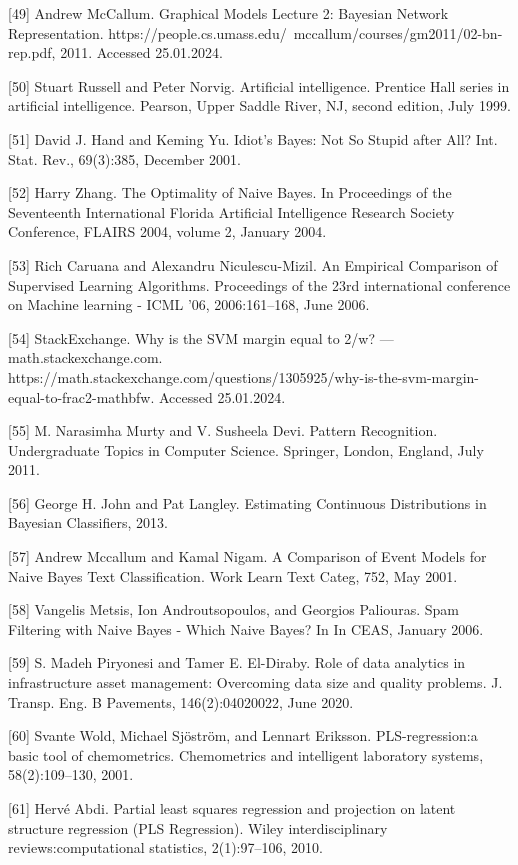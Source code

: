 \documentclass[preprint,12pt]{elsarticle}
\begin{document}
[49] Andrew McCallum. Graphical Models Lecture 2: Bayesian Network Representation. https://people.cs.umass.edu/~mccallum/courses/gm2011/02-bn-rep.pdf, 2011. Accessed 25.01.2024. 

[50] Stuart Russell and Peter Norvig. Artificial intelligence. Prentice Hall series in artificial intelligence. Pearson, Upper Saddle River, NJ, second edition, July 1999. 

[51] David J. Hand and Keming Yu. Idiot’s Bayes: Not So Stupid after All? Int. Stat. Rev., 69(3):385, December 2001. 

[52] Harry Zhang. The Optimality of Naive Bayes. In Proceedings of the Seventeenth International Florida Artificial Intelligence Research Society Conference, FLAIRS 2004, volume 2, January 2004. 

[53] Rich Caruana and Alexandru Niculescu-Mizil. An Empirical Comparison of Supervised Learning Algorithms. Proceedings of the 23rd international conference on Machine learning - ICML ’06, 2006:161–168, June 2006. 

[54] StackExchange. Why is the SVM margin equal to 2/w? — math.stackexchange.com. https://math.stackexchange.com/questions/1305925/why-is-the-svm-margin-equal-to-frac2-mathbfw. Accessed 25.01.2024. 

[55] M. Narasimha Murty and V. Susheela Devi. Pattern Recognition. Undergraduate Topics in Computer Science. Springer, London, England, July 2011. 

[56] George H. John and Pat Langley. Estimating Continuous Distributions in Bayesian Classifiers, 2013. 

[57] Andrew Mccallum and Kamal Nigam. A Comparison of Event Models for Naive Bayes Text Classification. Work Learn Text Categ, 752, May 2001. 

[58] Vangelis Metsis, Ion Androutsopoulos, and Georgios Paliouras. Spam Filtering with Naive Bayes - Which Naive Bayes? In In CEAS, January 2006. 

[59] S. Madeh Piryonesi and Tamer E. El-Diraby. Role of data analytics in infrastructure asset management: Overcoming data size and quality problems. J. Transp. Eng. B Pavements, 146(2):04020022, June 2020. 

[60] Svante Wold, Michael Sjöström, and Lennart Eriksson. PLS-regression:a basic tool of chemometrics. Chemometrics and intelligent laboratory systems, 58(2):109–130, 2001. 

[61] Hervé Abdi. Partial least squares regression and projection on latent structure regression (PLS Regression). Wiley interdisciplinary reviews:computational statistics, 2(1):97–106, 2010. 
\end{document}
